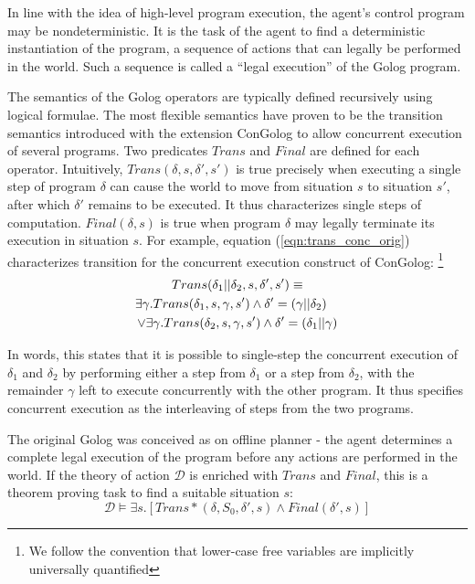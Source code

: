 \documentclass[letterpaper]{article}
\begin{document}
In line with the idea of high-level program execution, the agent's
control program may be nondeterministic. It is the task of the agent to
find a deterministic instantiation of the program, a sequence of actions
that can legally be performed in the world. Such a sequence is called a ``legal
execution'' of the Golog program.

The semantics of the Golog operators are typically defined recursively
using logical formulae. The most flexible semantics have proven to
be the transition semantics introduced with the extension ConGolog
\cite{giacomo00congolog} to allow concurrent execution of several
programs. Two predicates $Trans$ and $Final$ are defined for each
operator. Intuitively, $Trans(\delta,s,\delta',s')$ is true precisely
when executing a single step of program $\delta$ can cause the world
to move from situation $s$ to situation $s'$, after which $\delta'$
remains to be executed. It thus characterizes single steps of computation.
$Final(\delta,s)$ is true when program
$\delta$ may legally terminate its execution in situation $s$.  For example,
equation (\ref{eqn:trans_conc_orig}) characterizes transition for the 
concurrent execution construct of ConGolog:
\footnote{We follow the convention that lower-case free variables are
implicitly universally quantified}
\begin{multline}
\label{eqn:trans_conc_orig}
Trans(\delta_{1}||\delta_{2},s,\delta',s')\equiv\\
\shoveright{\exists\gamma. Trans(\delta_{1},s,\gamma,s')\wedge \delta'=(\gamma||\delta_2)}\\
\vee\exists\gamma. Trans(\delta_{2},s,\gamma,s')\wedge \delta'=(\delta_1 || \gamma)
\end{multline}

In words, this states that it is possible to single-step the concurrent
execution of $\delta_1$ and $\delta_2$ by performing either a step from
$\delta_1$ or a step from $\delta_2$, with the remainder $\gamma$ left
to execute
concurrently with the other program.
It thus specifies concurrent execution as the interleaving of steps from
the two programs.

The original Golog was conceived as on offline planner - the agent
determines a complete legal execution of the program before any actions
are performed in the world.  If the theory of action $\mathcal{D}$ is enriched
with $Trans$ and $Final$, this is a theorem proving task to find a suitable
situation $s$:
\begin{equation}
\label{eqn:golog_execution}
\mathcal{D}\models\exists s.\left[Trans*(\delta,S_{0},\delta',s)\wedge Final(\delta',s)\right]
\end{equation}
\end{document}
